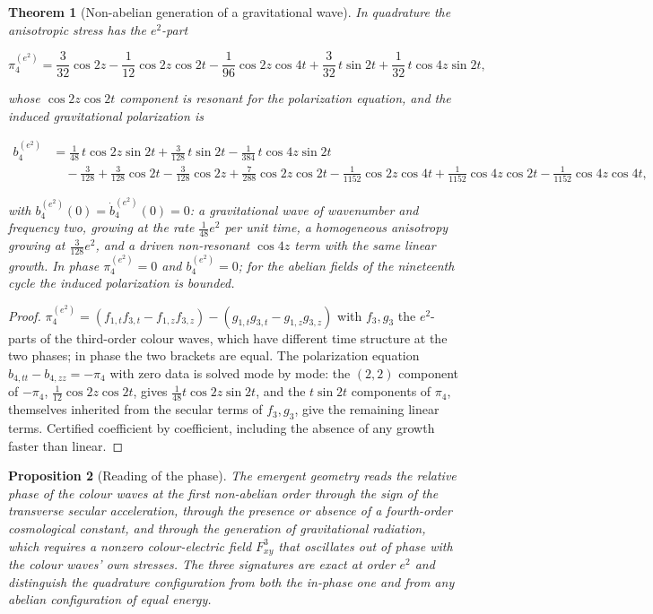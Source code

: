 \documentclass[11pt]{article}
\newtheorem{theorem}{Theorem}[section]
\newtheorem{proposition}[theorem]{Proposition}
\theoremstyle{remark}
\begin{document}
\begin{theorem}[Non-abelian generation of a gravitational wave]
\label{thm:v20v2-gw}
In quadrature the anisotropic stress has the \(e^2\)-part

\[
 \pi_4^{(e^2)}=\frac3{32}\cos2z-\frac1{12}\cos2z\cos2t-\frac1{96}\cos2z\cos4t
 +\frac3{32}\,t\sin2t+\frac1{32}\,t\cos4z\sin2t,                        \tag{5.2}
\]

whose \(\cos2z\cos2t\) component is resonant for the polarization
equation, and the induced gravitational polarization is

\[
\begin{aligned}
 b_4^{(e^2)}&=\frac1{48}\,t\cos2z\sin2t+\frac3{128}\,t\sin2t-\frac1{384}\,t\cos4z\sin2t\\
 &\quad-\frac3{128}+\frac3{128}\cos2t-\frac3{128}\cos2z+\frac7{288}\cos2z\cos2t
 -\frac1{1152}\cos2z\cos4t+\frac1{1152}\cos4z\cos2t-\frac1{1152}\cos4z\cos4t,
\end{aligned}                                                          \tag{5.3}
\]

with \(b_4^{(e^2)}(0)=\dot b_4^{(e^2)}(0)=0\): a gravitational wave of
wavenumber and frequency two, growing at the rate \(\tfrac1{48}e^2\)
per unit time, a homogeneous anisotropy growing at \(\tfrac3{128}e^2\),
and a driven non-resonant \(\cos4z\) term with the same linear growth.
In phase \(\pi_4^{(e^2)}=0\) and \(b_4^{(e^2)}=0\); for the abelian
fields of the nineteenth cycle the induced polarization is bounded.
\end{theorem}

\begin{proof}
\(\pi_4^{(e^2)}=(f_{1,t}f_{3,t}-f_{1,z}f_{3,z})-(g_{1,t}g_{3,t}-g_{1,z}g_{3,z})\)
with \(f_3,g_3\) the \(e^2\)-parts of the third-order colour waves,
which have different time structure at the two phases; in phase the
two brackets are equal.  The polarization equation
\(b_{4,tt}-b_{4,zz}=-\pi_4\) with zero data is solved mode by mode: the
\((2,2)\) component of \(-\pi_4\), \(\tfrac1{12}\cos2z\cos2t\), gives
\(\tfrac1{48}t\cos2z\sin2t\), and the \(t\sin2t\) components of
\(\pi_4\), themselves inherited from the secular terms of \(f_3,g_3\),
give the remaining linear terms.  Certified coefficient by
coefficient, including the absence of any growth faster than linear.
\end{proof}

\begin{proposition}[Reading of the phase]
\label{prop:v20v2-reading}
The emergent geometry reads the relative phase of the colour waves at
the first non-abelian order through the sign of the transverse secular
acceleration, through the presence or absence of a fourth-order
cosmological constant, and through the generation of gravitational
radiation, which requires a nonzero colour-electric field
\(F^3_{xy}\) that oscillates out of phase with the colour waves'
own stresses.  The three signatures are exact at order \(e^2\) and
distinguish the quadrature configuration from both the in-phase one
and from any abelian configuration of equal energy.
\end{proposition}
\end{document}

